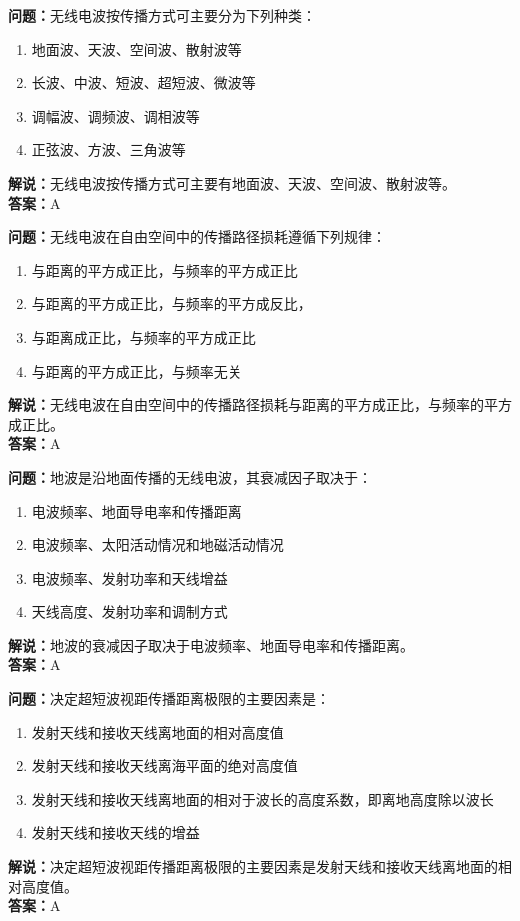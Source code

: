 \documentclass{ctexbook}%
\begin{document}
\textbf{问题：}无线电波按传播方式可主要分为下列种类：
\begin{enumerate}[label=\Alph*), leftmargin=3em]
\item 地面波、天波、空间波、散射波等
\item 长波、中波、短波、超短波、微波等
\item 调幅波、调频波、调相波等
\item 正弦波、方波、三角波等
\end{enumerate}
\textbf{解说：}无线电波按传播方式可主要有地面波、天波、空间波、散射波等。\\
\textbf{答案：}A

\textbf{问题：}无线电波在自由空间中的传播路径损耗遵循下列规律：
\begin{enumerate}[label=\Alph*), leftmargin=3em]
\item 与距离的平方成正比，与频率的平方成正比
\item 与距离的平方成正比，与频率的平方成反比，
\item 与距离成正比，与频率的平方成正比
\item 与距离的平方成正比，与频率无关
\end{enumerate}
\textbf{解说：}无线电波在自由空间中的传播路径损耗与距离的平方成正比，与频率的平方成正比。\\
\textbf{答案：}A

\textbf{问题：}地波是沿地面传播的无线电波，其衰减因子取决于：
\begin{enumerate}[label=\Alph*), leftmargin=3em]
\item 电波频率、地面导电率和传播距离
\item 电波频率、太阳活动情况和地磁活动情况
\item 电波频率、发射功率和天线增益
\item 天线高度、发射功率和调制方式
\end{enumerate}
\textbf{解说：}地波的衰减因子取决于电波频率、地面导电率和传播距离。\\
\textbf{答案：}A

\textbf{问题：}决定超短波视距传播距离极限的主要因素是：
\begin{enumerate}[label=\Alph*), leftmargin=3em]
\item 发射天线和接收天线离地面的相对高度值
\item 发射天线和接收天线离海平面的绝对高度值
\item 发射天线和接收天线离地面的相对于波长的高度系数，即离地高度除以波长
\item 发射天线和接收天线的增益
\end{enumerate}
\textbf{解说：}决定超短波视距传播距离极限的主要因素是发射天线和接收天线离地面的相对高度值。\\
\textbf{答案：}A
\end{document}
